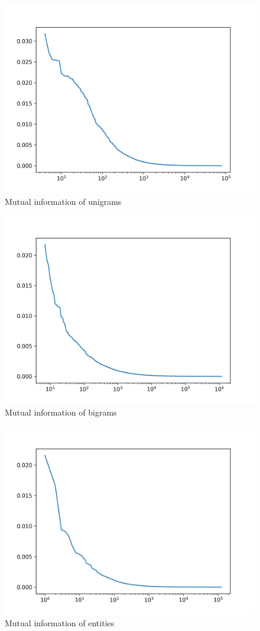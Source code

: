 \begin{figure}[ht]\centering
\includegraphics[width=130mm]{figures/unigrams.png}
\caption{Mutual information of unigrams}
\label{fig:mi_unigrams}
\end{figure}

\begin{figure}[ht]\centering
\includegraphics[width=130mm]{figures/bigrams.png}
\caption{Mutual information of bigrams}
\label{fig:mi_bigrams}
\end{figure}

\begin{figure}[ht]\centering
\includegraphics[width=130mm]{figures/entities.png}
\caption{Mutual information of entities}
\label{fig:mi_entities}
\end{figure}
